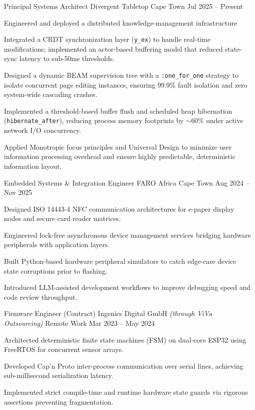
\begin{cventries}

  \cventry
  {Principal Systems Architect}
  {Divergent Tabletop}
  {Cape Town}
  {Jul 2025 -- Present}
  {
    \begin{cvitems}
      \item Engineered and deployed a distributed knowledge-management infrastructure
      \item Integrated a CRDT synchronization layer (\texttt{y\_ex}) to handle real-time modifications; implemented an actor-based buffering model that reduced state-sync latency to sub-50ms thresholds.
      \item Designed a dynamic BEAM supervision tree with a \texttt{:one\_for\_one} strategy to isolate concurrent page editing instances, ensuring 99.9\% fault isolation and zero system-wide cascading crashes.
      \item Implemented a threshold-based buffer flush and scheduled heap hibernation (\texttt{hibernate\_after}), reducing process memory footprints by $\sim$60\% under active network I/O concurrency.
      \item Applied Monotropic focus principles and Universal Design to minimize user information processing overhead and ensure highly predictable, deterministic information layout.
    \end{cvitems}
  }

  \cventry
  {Embedded Systems \& Integration Engineer}
  {FARO Africa}
  {Cape Town}
  {Aug 2024 -- Nov 2025}
  {
    \begin{cvitems}
      \item Designed ISO 14443-4 NFC communication architectures for e-paper display nodes and secure card reader matrices.
      \item Engineered lock-free asynchronous device management services bridging hardware peripherals with application layers.
      \item Built Python-based hardware peripheral simulators to catch edge-case device state corruptions prior to flashing.
      \item Introduced LLM-assisted development workflows to improve debugging speed and code review throughput.
    \end{cvitems}
  }

  \cventry
  {Firmware Engineer (Contract)}
  {Ingenics Digital GmbH \emph{(through ViVa Outsourcing)}}
  {Remote Work}
  {Mar 2023 -- May 2024}
  {
    \begin{cvitems}
      \item Architected deterministic finite state machines (FSM) on dual-core ESP32 using FreeRTOS for concurrent sensor arrays.
      \item Developed Cap'n Proto inter-process communication over serial lines, achieving sub-millisecond serialization latency.
      \item Implemented strict compile-time and runtime hardware state guards via rigorous assertions preventing fragmentation.
    \end{cvitems}
  }


\end{cventries}
